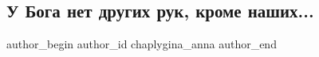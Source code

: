  
 
 
 
 

\subsection{У Бога нет других рук, кроме наших...}
\label{sec:24_04_2022.fb.chaplygina_anna.1.u_boga_net_drugikh_r}

\ifcmt
 author_begin
   author_id chaplygina_anna
 author_end
\fi
